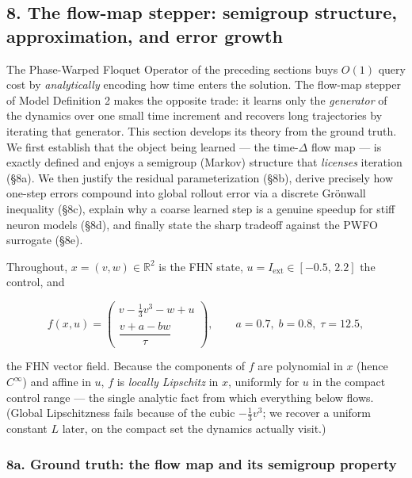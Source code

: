 \documentclass[
  11pt,
]{article}
\begin{document}
\subsection{8. The flow-map stepper: semigroup structure, approximation,
and error
growth}\label{the-flow-map-stepper-semigroup-structure-approximation-and-error-growth}

The Phase-Warped Floquet Operator of the preceding sections buys
\(O(1)\) query cost by \emph{analytically} encoding how time enters the
solution. The flow-map stepper of Model Definition 2 makes the opposite
trade: it learns only the \emph{generator} of the dynamics over one
small time increment and recovers long trajectories by iterating that
generator. This section develops its theory from the ground truth. We
first establish that the object being learned --- the time-\(\Delta\)
flow map --- is exactly defined and enjoys a semigroup (Markov)
structure that \emph{licenses} iteration (§8a). We then justify the
residual parameterization (§8b), derive precisely how one-step errors
compound into global rollout error via a discrete Grönwall inequality
(§8c), explain why a coarse learned step is a genuine speedup for stiff
neuron models (§8d), and finally state the sharp tradeoff against the
PWFO surrogate (§8e).

Throughout, \(x=(v,w)\in\mathbb{R}^{2}\) is the FHN state,
\(u=I_{\mathrm{ext}}\in[-0.5,\,2.2]\) the control, and

\[
f(x,u)=\begin{pmatrix} v-\tfrac{1}{3}v^{3}-w+u \\[2pt] \dfrac{v+a-bw}{\tau}\end{pmatrix},
\qquad a=0.7,\; b=0.8,\; \tau=12.5,
\tag{8.1}
\]

the FHN vector field. Because the components of \(f\) are polynomial in
\(x\) (hence \(C^{\infty}\)) and affine in \(u\), \(f\) is \emph{locally
Lipschitz} in \(x\), uniformly for \(u\) in the compact control range
--- the single analytic fact from which everything below flows. (Global
Lipschitzness fails because of the cubic \(-\tfrac13 v^3\); we recover a
uniform constant \(L\) later, on the compact set the dynamics actually
visit.)

\subsubsection{8a. Ground truth: the flow map and its semigroup
property}\label{a.-ground-truth-the-flow-map-and-its-semigroup-property}
\end{document}
